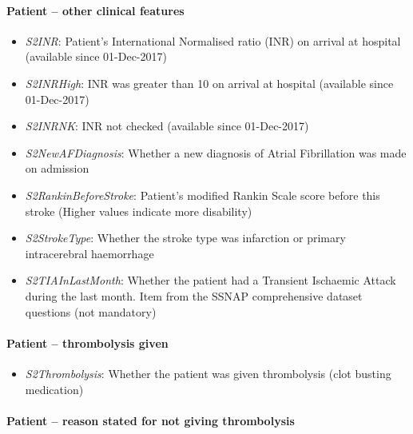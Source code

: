 \paragraph{Patient -- other clinical features}

\begin{itemize}
\item \emph{S2INR}: Patient's International Normalised ratio (INR) on arrival at
  hospital (available since 01-Dec-2017)
\item \emph{S2INRHigh}: INR was greater than 10 on arrival at hospital (available
  since 01-Dec-2017)
\item \emph{S2INRNK}: INR not checked (available since 01-Dec-2017)
\item \emph{S2NewAFDiagnosis}: Whether a new diagnosis of Atrial Fibrillation was
  made on admission
\item \emph{S2RankinBeforeStroke}: Patient's modified Rankin Scale score before
  this stroke (Higher values indicate more disability)
\item \emph{S2StrokeType}: Whether the stroke type was infarction or primary
  intracerebral haemorrhage
\item \emph{S2TIAInLastMonth}: Whether the patient had a Transient Ischaemic Attack
  during the last month. Item from the SSNAP comprehensive dataset
  questions (not mandatory)
\end{itemize}

\paragraph{Patient -- thrombolysis given}

\begin{itemize}
\item \emph{S2Thrombolysis}: Whether the patient was given thrombolysis (clot
  busting medication)
\end{itemize}

\paragraph{Patient -- reason stated for not giving thrombolysis}

